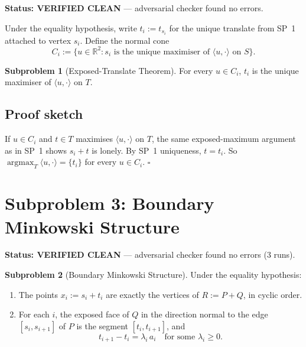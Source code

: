 \documentclass[12pt,a4paper]{article}
\theoremstyle{definition}
\newtheorem{subproblem}{Subproblem}
\begin{document}
\begin{cleanenv}
\textbf{Status: VERIFIED CLEAN} --- adversarial checker found no errors.
\end{cleanenv}

Under the equality hypothesis, write $t_i:=t_{s_i}$ for the unique translate from SP~1
attached to vertex $s_i$.  Define the normal cone
\[
  C_i := \{u\in\mathbb{R}^2 : \text{$s_i$ is the unique maximiser of $\langle u,\cdot\rangle$ on $S$}\}.
\]

\begin{subproblem}[Exposed-Translate Theorem]\label{sp:2}
For every $u\in C_i$, $t_i$ is the unique maximiser of $\langle u,\cdot\rangle$ on $T$.
\end{subproblem}

\subsection*{Proof sketch}

If $u\in C_i$ and $t\in T$ maximises $\langle u,\cdot\rangle$ on $T$, the same exposed-maximum
argument as in SP~1 shows $s_i+t$ is lonely.
By SP~1 uniqueness, $t=t_i$.
So $\operatorname{argmax}_T\langle u,\cdot\rangle=\{t_i\}$ for every $u\in C_i$. $\square$

\section{Subproblem 3: Boundary Minkowski Structure}

\begin{cleanenv}
\textbf{Status: VERIFIED CLEAN} --- adversarial checker found no errors (3 runs).
\end{cleanenv}

\begin{subproblem}[Boundary Minkowski Structure]\label{sp:3}
Under the equality hypothesis:
\begin{enumerate}[label=(\arabic*)]
\item The points $x_i:=s_i+t_i$ are exactly the vertices of $R:=P+Q$, in cyclic order.
\item For each $i$, the exposed face of $Q$ in the direction normal to the edge $[s_i,s_{i+1}]$
      of $P$ is the segment $[t_i,t_{i+1}]$, and
      \[
        t_{i+1}-t_i = \lambda_i\,a_i \quad\text{for some }\lambda_i\ge 0.
      \]
\end{enumerate}
\end{subproblem}
\end{document}
